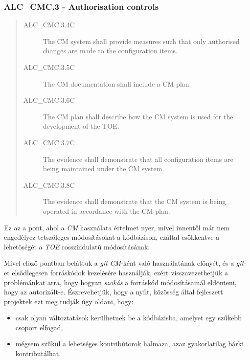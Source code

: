 \pagebreak[1]
\subsubsection{ALC\_CMC.3 - Authorisation controls}
\begin{quote}
    \begin{description}
        \item[ALC\_CMC.3.4C]{The CM system shall provide measures such that only authorised changes
            are made to the configuration items.}
        \item[ALC\_CMC.3.5C]{The CM documentation shall include a CM plan.}
        \item[ALC\_CMC.3.6C]{The CM plan shall describe how the CM system is used for the
            development of the TOE.}
        \item[ALC\_CMC.3.7C]{The evidence shall demonstrate that all configuration items are being
            maintained under the CM system.}
        \item[ALC\_CMC.3.8C]{The evidence shall demonstrate that the CM system is being operated in
            accordance with the CM plan.}
    \end{description}
\end{quote}

Ez az a pont, ahol a \emph{CM} használata értelmet nyer, mivel innentől már nem engedélyez
tetszőleges módosításokat a kódbázison, ezáltal csökkentve a lehetőségét a \emph{TOE} rosszindulatú
módosításának.

Mivel előző pontban beláttuk a \emph{git} \emph{CM}-ként való  használatának előnyét, és
a \emph{git}-et elsődlegesen forráskódok kezelésére használják, ezért visszavezethetjük
a problémánkat arra, hogy hogyan \emph{szokás} a forráskód módosításainál eldönteni, hogy az
autorizált-e.  Észrevehetjük, hogy a nyílt, közösség által fejleszett projektek ezt meg tudják úgy
oldani, hogy:
\begin{itemize}
    \item{csak olyan változtatások kerülhetnek be a kódbázisba, amelyet egy szűkebb csoport
        elfogad,}
    \item{mégsem szűkül a lehetséges kontribútorok halmaza, azaz gyakorlatilag bárki
        kontributálhat.}
\end{itemize}

